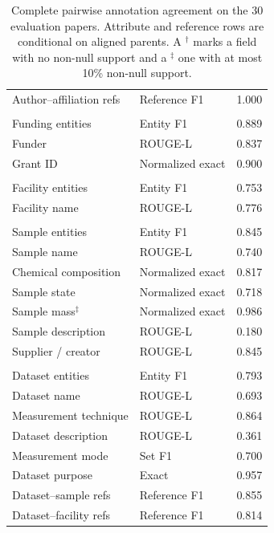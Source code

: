 \begin{table}[t]
\begin{tabular}{@{}p{}p{}r@{}}
    Author--affiliation refs & Reference F1 & 1.000 \\
    \addlinespace
    \midrule
    \multicolumn{3}{@{}l}{\textit{Funding}} \\
    Funding entities & Entity F1 & 0.889 \\
    Funder & ROUGE-L & 0.837 \\
    Grant ID & Normalized exact & 0.900 \\
    \addlinespace
    \midrule
    \multicolumn{3}{@{}l}{\textit{Facilities}} \\
    Facility entities & Entity F1 & 0.753 \\
    Facility name & ROUGE-L & 0.776 \\
    \addlinespace
    \midrule
    \multicolumn{3}{@{}l}{\textit{Samples}} \\
    Sample entities & Entity F1 & 0.845 \\
    Sample name & ROUGE-L & 0.740 \\
    Chemical composition & Normalized exact & 0.817 \\
    Sample state & Normalized exact & 0.718 \\
    Sample mass$^{\ddagger}$ & Normalized exact & 0.986 \\
    Sample description & ROUGE-L & 0.180 \\
    Supplier / creator & ROUGE-L & 0.845 \\
    \addlinespace
    \midrule
    \multicolumn{3}{@{}l}{\textit{Datasets}} \\
    Dataset entities & Entity F1 & 0.793 \\
    Dataset name & ROUGE-L & 0.693 \\
    Measurement technique & ROUGE-L & 0.864 \\
    Dataset description & ROUGE-L & 0.361 \\
    Measurement mode & Set F1 & 0.700 \\
    Dataset purpose & Exact & 0.957 \\
    Dataset--sample refs & Reference F1 & 0.855 \\
    Dataset--facility refs & Reference F1 & 0.814 \\
    \bottomrule
  \end{tabular}
  \caption{Complete pairwise annotation agreement on the 30
  evaluation papers. Attribute and reference rows are
  conditional on aligned parents. A $^{\dagger}$ marks a field with
  no non-null support and a $^{\ddagger}$ one with at most 10\%
  non-null support.}
  \label{tab:appendix-iaa}
\end{table}
